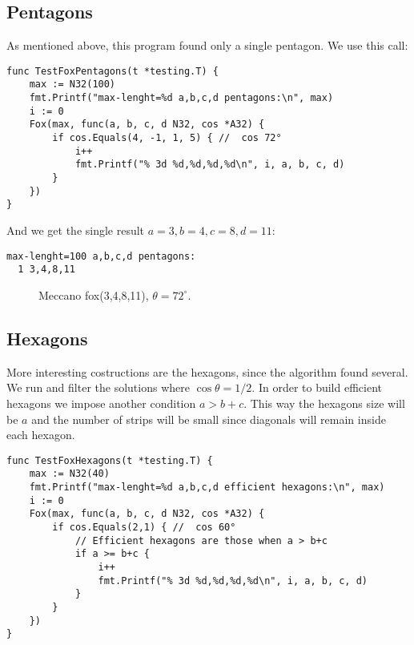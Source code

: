 \documentclass[11pt]{article}
\begin{document}
\subsection{Pentagons}
As mentioned above, this program found only a single pentagon. We use this call:
\begin{lstlisting}
func TestFoxPentagons(t *testing.T) {
	max := N32(100)
	fmt.Printf("max-lenght=%d a,b,c,d pentagons:\n", max)
	i := 0
	Fox(max, func(a, b, c, d N32, cos *A32) {
		if cos.Equals(4, -1, 1, 5) { //  cos 72°
			i++
			fmt.Printf("% 3d %d,%d,%d,%d\n", i, a, b, c, d)
		}
	})
}
\end{lstlisting}
And we get the single result $a=3, b=4, c=8, d=11$:
\begin{lstlisting}
max-lenght=100 a,b,c,d pentagons:
  1 3,4,8,11
\end{lstlisting}

\begin{figure}[h!]
\centering
{}
\caption{Meccano fox(3,4,8,11), $\theta=72^\circ$.}
\end{figure}


\subsection{Hexagons}
More interesting costructions are the hexagons, since the algorithm found several.
We run and filter the solutions where $\cos{\theta} = 1/2$. In order to build efficient
hexagons we impose another condition $a > b+c$. This way the hexagons size will be $a$
and the number of strips will be small since diagonals will remain inside each hexagon.

\begin{lstlisting}
func TestFoxHexagons(t *testing.T) {
	max := N32(40)
	fmt.Printf("max-lenght=%d a,b,c,d efficient hexagons:\n", max)
	i := 0
	Fox(max, func(a, b, c, d N32, cos *A32) {
		if cos.Equals(2,1) { //  cos 60°
			// Efficient hexagons are those when a > b+c
			if a >= b+c {
				i++
				fmt.Printf("% 3d %d,%d,%d,%d\n", i, a, b, c, d)
			}
		}
	})
}
\end{lstlisting}
\end{document}
